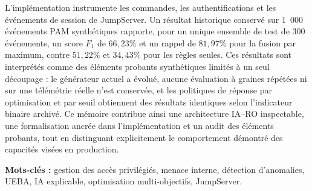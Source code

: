 \documentclass[11pt,a4paper,oneside]{report}
\theoremstyle{definition}
\theoremstyle{plain}
\begin{document}
L'implémentation instrumente les commandes, les authentifications et les événements de session de JumpServer. Un résultat historique conservé sur 1~000 événements PAM synthétiques rapporte, pour un unique ensemble de test de 300 événements, un score $F_1$ de $66{,}23\%$ et un rappel de $81{,}97\%$ pour la fusion par maximum, contre $51{,}22\%$ et $34{,}43\%$ pour les règles seules. Ces résultats sont interprétés comme des éléments probants synthétiques limités à un seul découpage : le générateur actuel a évolué, aucune évaluation à graines répétées ni sur une télémétrie réelle n'est conservée, et les politiques de réponse par optimisation et par seuil obtiennent des résultats identiques selon l'indicateur binaire archivé. Ce mémoire contribue ainsi une architecture IA--RO inspectable, une formalisation ancrée dans l'implémentation et un audit des éléments probants, tout en distinguant explicitement le comportement démontré des capacités visées en production.

\medskip
\noindent\textbf{Mots-clés :} gestion des accès privilégiés, menace interne, détection d'anomalies, UEBA, IA explicable, optimisation multi-objectifs, JumpServer.
\end{document}
